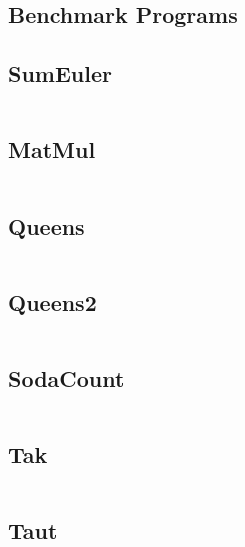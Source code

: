 \documentclass[openright, dottedtoc, headinclude, footinclude=true, a4paper, numbers=noenddot]{scrreprt}
\begin{document}
\begin{appendices}

\chapter{Benchmark Programs}
\label{append:bench}

    \section{SumEuler}
    \inputminted{haskell}{benchmarks/SumEuler.hs}
    \clearpage

    \section{MatMul}
    \inputminted{haskell}{benchmarks/MatMul.hs}
    \clearpage

    \section{Queens}
    \inputminted{haskell}{benchmarks/Queens.hs}
    \clearpage

    \section{Queens2}
    \inputminted{haskell}{benchmarks/Queens2.hs}
    \clearpage

    \section{SodaCount}
    \inputminted{haskell}{benchmarks/SodaCount.hs}
    \clearpage

    \section{Tak}
    \inputminted{haskell}{benchmarks/tak.hs}
    \clearpage

    \section{Taut}
    \inputminted{haskell}{benchmarks/Taut.hs}
    \clearpage

\end{appendices}

\listoftodos[Notes]

\if@openright
  \cleardoublepage
\else
  \clearpage
\fi



\end{document}
